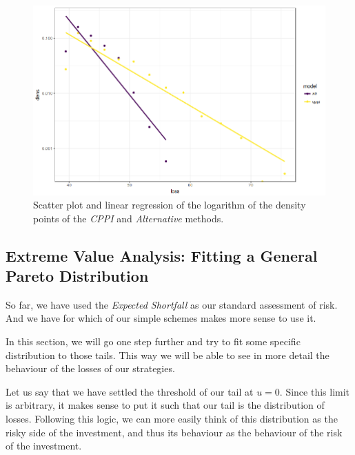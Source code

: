 \begin{figure}[h]
    \centering
    \includegraphics[scale=0.5]{images/lm_tails.png}
    \caption{Scatter plot and linear regression of the logarithm of the density points of the \textit{CPPI} and \textit{Alternative} methods.}
    \label{fig:lm-tails}
\end{figure}


\subsection{Extreme Value Analysis: Fitting a General Pareto Distribution}

So far, we have used the \emph{Expected Shortfall} as our standard assessment of risk. And we have for which of our simple schemes makes more sense to use it. 

In this section, we will go one step further and try to fit some specific distribution to those tails. This way we will be able to see in more detail the behaviour of the losses of our strategies.

Let us say that we have settled the threshold of our tail at $u = 0$. Since this limit is arbitrary, it makes sense to put it such that our tail is the distribution of losses. Following this logic, we can more easily think of this distribution as the risky side of the investment, and thus its behaviour as the behaviour of the risk of the investment.



